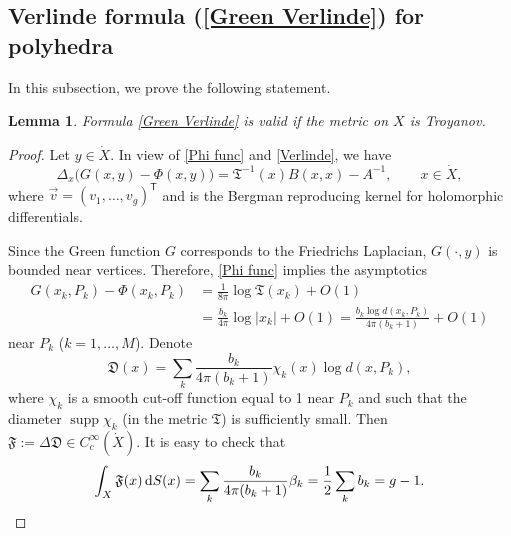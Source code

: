 \documentclass[pdftex]{sigma}
\numberwithin{equation}{section}
\newtheorem{Lemma}[Theorem]{Lemma}
\theoremstyle{definition}
\begin{document}
\subsection*{Verlinde formula (\ref{Green Verlinde}) for polyhedra} In this subsection, we prove the following statement.
\begin{Lemma}\label{Ver Vert Lem}
Formula {\rm \eqref{Green Verlinde}} is valid if the metric on $X$ is Troyanov.
\end{Lemma}
\begin{proof}
Let $y\in\dot{X}$. In view of \eqref{Phi func} and \eqref{Verlinde}, we have
\begin{equation}
\label{delta of phi}
\Delta_{x}\bigl(G(x,y)-\Phi(x,y)\bigr)=\mathfrak{T}^{-1}(x)B(x,x)-A^{-1}, \qquad x\in\dot{X},
\end{equation}
where $\vec{v}=(v_1,\dots,v_g)^{\mathsf T}$ and
is the Bergman reproducing kernel for holomorphic differentials.

Since the Green function $G$ corresponds to the Friedrichs Laplacian, $G(\cdot,y)$ is bounded near vertices. Therefore, \eqref{Phi func} implies the asymptotics
\begin{align}
G(x_k,P_k)-\Phi(x_k,P_k)&=\frac{1}{8\pi}\log \mathfrak{T}(x_k)+O(1)\nonumber\\
&=\frac{b_k}{4\pi}\log |x_k|+O(1)=\frac{b_k\log d(x_k,P_k)}{4\pi(b_k+1)}+O(1)\label{Phi near vertices}
\end{align}
near $P_k$ ($k=1,\dots,M$). Denote
\[\mathfrak{D}(x)=\sum_k \frac{b_k}{4\pi(b_k+1)}\chi_k(x)\log d(x,P_k),\]
where $\chi_k$ is a smooth cut-off function equal to 1 near $P_k$ and such that the diameter $\operatorname{supp}\chi_k$ (in the metric $\mathfrak{T}$) is sufficiently small. Then $\mathfrak{F}:=\Delta \mathfrak{D}\in C_c^{\infty}(\dot{X})$. It is easy to check that
\begin{equation}\label{for ortho}
\int_{X}\mathfrak{F}(x)\,{\rm d }S(x)=\sum_k \frac{b_k}{4\pi(b_k+1)}\beta_k=\frac{1}{2}\sum_{k}b_k=g-1.
\end{equation}


\end{proof}
\end{document}
